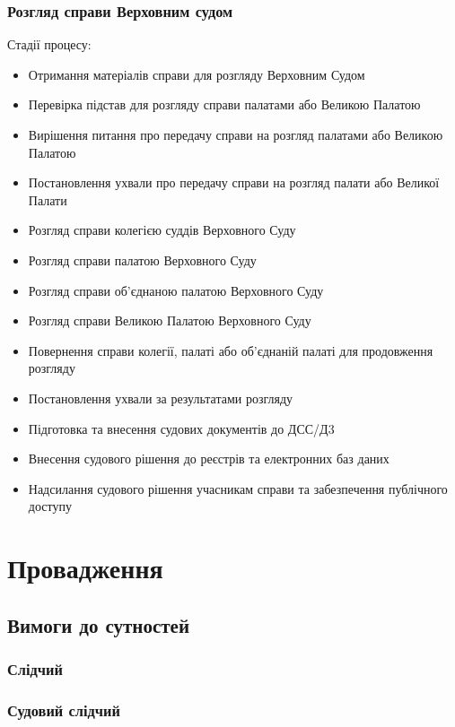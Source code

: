 \documentclass{article}
\begin{document}
\newpage
\subsubsection{Розгляд справи Верховним судом}

Стадії процесу:

\begin{itemize}
    \item Отримання матеріалів справи для розгляду Верховним Судом
    \item Перевірка підстав для розгляду справи палатами або Великою Палатою
    \item Вирішення питання про передачу справи на розгляд палатами або Великою Палатою
    \item Постановлення ухвали про передачу справи на розгляд палати або Великої Палати
    \item Розгляд справи колегією суддів Верховного Суду
    \item Розгляд справи палатою Верховного Суду
    \item Розгляд справи об’єднаною палатою Верховного Суду
    \item Розгляд справи Великою Палатою Верховного Суду
    \item Повернення справи колегії, палаті або об’єднаній палаті для продовження розгляду
    \item Постановлення ухвали за результатами розгляду
    \item Підготовка та внесення судових документів до ДСС/Д3
    \item Внесення судового рішення до реєстрів та електронних баз даних
    \item Надсилання судового рішення учасникам справи та забезпечення публічного доступу
\end{itemize}

\newpage
\section{Провадження}

\subsection{Вимоги до сутностей}

\subsubsection{Слідчий}

\subsubsection{Судовий слідчий}
\end{document}
